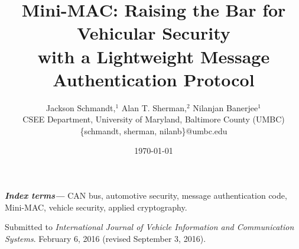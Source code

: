 \documentclass[12pt,twocolumn]{article}
\providecommand{\keywords}[1]{\textbf{\textit{Index terms---}} #1}
\begin{document}

\title{Mini-MAC: Raising the Bar for Vehicular Security\\
with a Lightweight Message Authentication Protocol}



\author{Jackson Schmandt,$^1$
Alan T. Sherman,$^2$ 
Nilanjan Banerjee$^1$\\
CSEE Department, University of Maryland, Baltimore County (UMBC)\\
\{schmandt, sherman, nilanb\}@umbc.edu\\}

\date{\today}

\maketitle




\keywords{CAN bus,
	automotive security,
	message authentication code,
	Mini-MAC,
	vehicle security,
	applied cryptography.
}
















	






\clearpage



\bigskip \noindent
Submitted to {\it International Journal of Vehicle Information and Communication Systems}. 
{February 6, 2016 (revised September 3, 2016)}.
\end{document}
